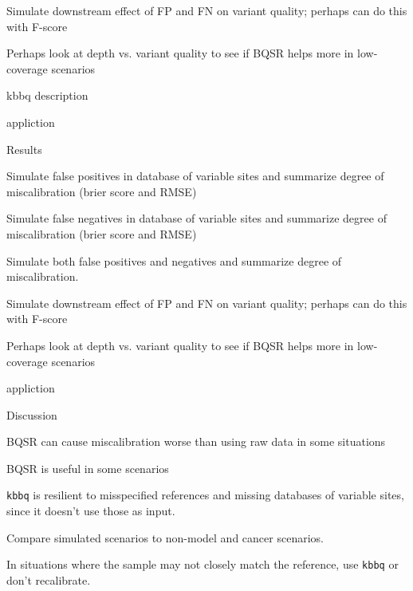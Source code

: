 \documentclass{article}
\begin{document}
\begin{outline}
\begin{outline}
		\item Simulate downstream effect of FP and FN on variant quality; perhaps can do this with F-score
		\item Perhaps look at depth vs. variant quality to see if BQSR helps more in low-coverage scenarios
		\item kbbq description
		\item appliction
	\end{outline}
	\item Results
	\begin{outline}
		\item Simulate false positives in database of variable sites and summarize degree of miscalibration (brier score and RMSE)
		\item Simulate false negatives in database of variable sites and summarize degree of miscalibration (brier score and RMSE)
		\item Simulate both false positives and negatives and summarize degree of miscalibration.
		\item Simulate downstream effect of FP and FN on variant quality; perhaps can do this with F-score
		\item Perhaps look at depth vs. variant quality to see if BQSR helps more in low-coverage scenarios
		\item appliction
	\end{outline}
	\item Discussion
	\begin{outline}
		\item BQSR can cause miscalibration worse than using raw data in some situations
		\item BQSR is useful in some scenarios
		\item \texttt{kbbq} is resilient to misspecified references and missing databases of variable sites, since it doesn't use those as input.
		\item Compare simulated scenarios to non-model and cancer scenarios.
		\begin{outline}
			\item In situations where the sample may not closely match the reference, use \texttt{kbbq} or don't recalibrate.
		\end{outline}
	\end{outline}
\end{outline}
\end{document}
